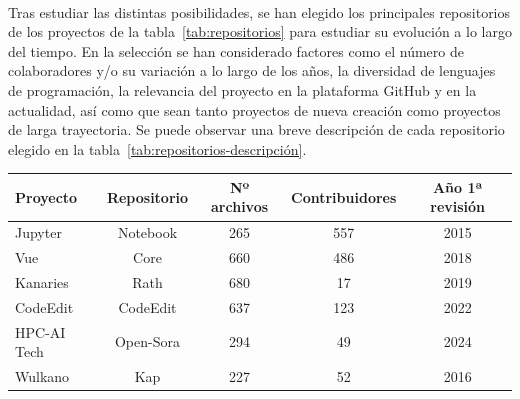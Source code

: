 \documentclass[a4paper, 12pt]{book}
\begin{document}
\\Tras estudiar las distintas posibilidades, se han elegido los principales repositorios de los proyectos de la tabla~\ref{tab:repositorios} para estudiar su evolución a lo largo del tiempo. En la selección se han considerado factores como el número de colaboradores y/o
su variación a lo largo de los años, la diversidad de lenguajes de programación, la relevancia del proyecto en la plataforma GitHub y en la actualidad, así como que sean tanto proyectos de nueva creación como proyectos de larga trayectoria. Se puede observar una breve descripción
de cada repositorio elegido en la tabla~\ref{tab:repositorios-descripción}.

\begin{table}
 \begin{center}
  \begin{tabular}{ | l | c | c | c | c |} %
    \hline
    \textbf{Proyecto}          & \textbf{Repositorio}           & \textbf{Nº archivos}           & \textbf{Contribuidores}  & \textbf{Año 1ª revisión}             \\ \hline %
    Jupyter                    & Notebook                       & 265                            & 557                      & 2015                                 \\ \hline
    Vue                        & Core                           & 660                            & 486                      & 2018                                 \\ \hline
    Kanaries                   & Rath                           & 680                            & 17                       & 2019                                 \\ \hline
    CodeEdit                   & CodeEdit                       & 637                            & 123                      & 2022                                 \\ \hline
    HPC-AI Tech                & Open-Sora                      & 294                            & 49                       & 2024                                 \\ \hline
    Wulkano                    & Kap                            & 227                            & 52                       & 2016                                 \\ \hline

\end{tabular}
\end{center}
\end{table}
\end{document}
